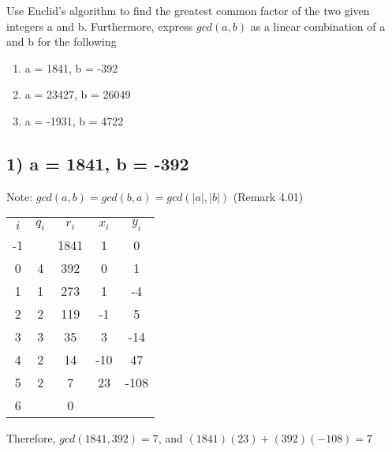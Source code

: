 \documentclass[12pt]{article} %
\begin{document}
\begin{homeworkProblem}
    \begin{grayBoxed}
        Use Euclid's algorithm to find the greatest common factor of the two given integers a and b.
        Furthermore, express $gcd(a, b)$ as a linear combination of a and b for the following

        \begin{enumerate}
            \item a = 1841, b = -392
            \item a = 23427, b = 26049
            \item a = -1931, b = 4722
        \end{enumerate}
    \end{grayBoxed}

    \subsection*{1) a = 1841, b = -392}

    Note: $gcd(a, b) = gcd(b, a) = gcd(|a|, |b|)$ (Remark 4.01)

    \begin{center}
        \begin{tabular}{ |c|c|c|c|c| }
            \hline
            $i$ & $q_i$ & $r_i$ & $x_i$ & $y_i$ \\
            -1  &       & 1841  & 1     & 0     \\
            0   & 4     & 392   & 0     & 1     \\
            1   & 1     & 273   & 1     & -4    \\
            2   & 2     & 119   & -1    & 5     \\
            3   & 3     & 35    & 3     & -14   \\
            4   & 2     & 14    & -10   & 47    \\
            5   & 2     & 7     & 23    & -108  \\
            6   &       & 0     &       &       \\
            \hline
        \end{tabular}
    \end{center}

    Therefore, $gcd(1841, 392) = 7$, and $(1841)(23) + (392)(-108) = 7$
\end{homeworkProblem}

\pagebreak
\end{document}
